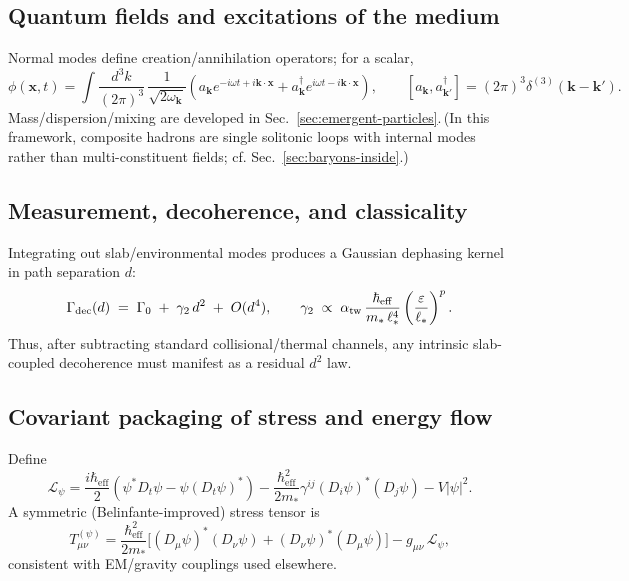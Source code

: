 \subsection{Quantum fields and excitations of the medium}
\label{sec:QM_qft}

Normal modes define creation/annihilation operators; for a scalar,
\begin{equation}
\phi(\mathbf{x},t)=\int \!\frac{d^3k}{(2\pi)^3}\,\frac{1}{\sqrt{2\omega_{\mathbf k}}}\left(a_{\mathbf k}e^{-i\omega t+i\mathbf{k}\cdot\mathbf{x}} + a_{\mathbf k}^\dagger e^{i\omega t-i\mathbf{k}\cdot\mathbf{x}}\right),\qquad [a_{\mathbf k},a_{\mathbf k'}^\dagger]=(2\pi)^3\delta^{(3)}(\mathbf k-\mathbf k').
\label{eq:mode-expansion}
\end{equation}
Mass/dispersion/mixing are developed in Sec.~\ref{sec:emergent-particles}.\;\,(In this framework, composite hadrons are single solitonic loops with internal modes rather than multi-constituent fields; cf. Sec.~\ref{sec:baryons-inside}.)

\subsection{Measurement, decoherence, and classicality}
\label{sec:QM_measurement}

Integrating out slab/environmental modes produces a Gaussian dephasing kernel in path separation \(d\):
\begin{equation}
\Gamma_{\mathrm{dec}}(d) \;=\; \Gamma_0 \;+\; \gamma_2\, d^2 \;+\; O(d^4), 
\qquad 
\gamma_2 \;\propto\; \alpha_{\rm tw}\,\frac{\hbar_{\mathrm{eff}}}{m_*\,\ell_*^4}\left(\frac{\varepsilon}{\ell_*}\right)^{p}.
\label{eq:decoherence}
\end{equation}
Thus, after subtracting standard collisional/thermal channels, any intrinsic slab-coupled decoherence must manifest as a residual \(d^2\) law.

\subsection{Covariant packaging of stress and energy flow}
\label{sec:QM_covariant}

Define
\[
\mathcal{L}_{\psi} = \frac{i\hbar_{\mathrm{eff}}}{2}(\psi^* D_t\psi - \psi (D_t\psi)^*) - \frac{\hbar_{\mathrm{eff}}^2}{2m_*}\gamma^{ij}(D_i\psi)^*(D_j\psi) - V|\psi|^2 .
\]
A symmetric (Belinfante-improved) stress tensor is
\begin{equation}
T_{\mu\nu}^{(\psi)} = \frac{\hbar_{\mathrm{eff}}^2}{2m_*}\Big[(D_\mu\psi)^* (D_\nu\psi) + (D_\nu\psi)^*(D_\mu\psi)\Big] - g_{\mu\nu}\,\mathcal{L}_{\psi},
\label{eq:stress}
\end{equation}
consistent with EM/gravity couplings used elsewhere.

